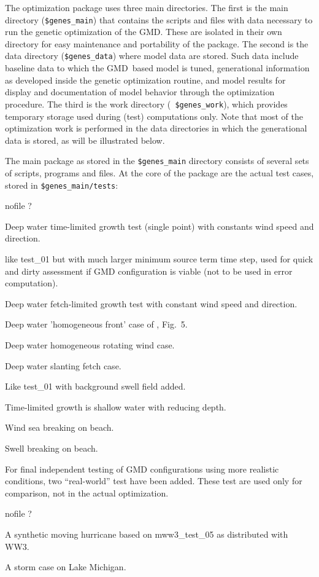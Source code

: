 \documentclass[12pt]{article}
\newcommand{\ws}{WW3}
\newcommand{\gmd}{GMD}
\newcommand{\file}{\sf}
\newcommand{\code}{\tt}
\newenvironment{flist}{\begin{list}{nofile ?}{\parsep 0mm
            \itemsep 0mm \leftmargin 35mm \labelwidth 25mm
            \rightmargin 10mm}}{\end{list}}
\newcommand{\fit}[2]{\item[{\file{#1}}\hfill]{#2}}
\begin{document}
The optimization package uses three main directories.  The first is the main
directory ({\code \$genes\_main}) that contains the scripts and files with
data necessary to run the genetic optimization of the \gmd. These are isolated
in their own directory for easy maintenance and portability of the package.
The second is the data directory ({\code \$genes\_data}) where model data are
stored. Such data include baseline data to which the \gmd\ based model is
tuned, generational information as developed inside the genetic optimization
routine, and model results for display and documentation of model behavior
through the optimization procedure.  The third is the work directory ({\code
\$genes\_work}), which provides temporary storage used during (test)
computations only. Note that most of the optimization work is performed in the
data directories in which the generational data is stored, as will be
illustrated below.

The main package as stored in the {\code \$genes\_main} directory consists of
several sets of scripts, programs and files. At the core of the package are
the actual test cases, stored in {\code \$genes\_main/tests}:

\begin{flist}
\fit{test\_01}{Deep water time-limited growth test (single point) with
               constants wind speed and direction.}
\fit{test\_0X}{like {\file test\_01} but with much larger minimum source term
               time step, used for quick and dirty assessment if GMD
               configuration is viable (not to be used in error computation).}
\fit{test\_02}{Deep water fetch-limited growth test with constant wind speed
               and direction.}
\fit{test\_03}{Deep water 'homogeneous front' case of \cite{tol:JPO92},
               Fig.~5.} 
\fit{test\_04}{Deep water homogeneous rotating wind case.}
\fit{test\_05}{Deep water slanting fetch case.}
\fit{test\_06}{Like {\file test\_01} with background swell field added.}
\fit{test\_11}{Time-limited growth is shallow water with reducing depth.}
\fit{test\_12}{Wind sea breaking on beach.}
\fit{test\_13}{Swell breaking on beach.}
\end{flist}

\noindent
For final independent testing of GMD configurations using more realistic
conditions, two ``real-world'' test have been added. These test are used only
for comparison, not in the actual optimization.

\begin{flist}
\fit{test\_hr}{A synthetic moving hurricane based on {\file
               mww3\_test\_05} as distributed with \ws.}
\fit{test\_LM}{A storm case on Lake Michigan.}
\end{flist}
\end{document}
